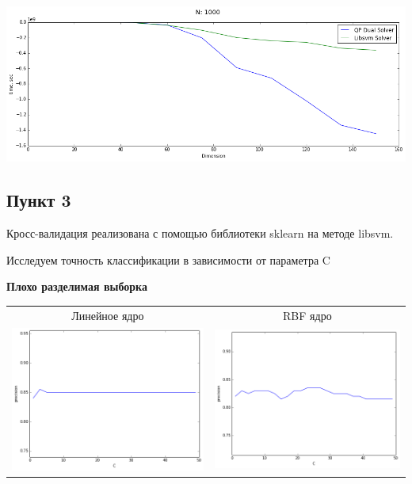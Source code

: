 \documentclass[12pt, a4paper]{article}
\begin{document}
			\begin{center}
				\includegraphics[width=18cm]{2par_obj_N1000_one.png}
			\end{center}

		\newpage
		\subsection{Пункт 3}
			Кросс-валидация реализована с помощью библиотеки sklearn на методе libsvm.

			Исследуем точность классификации в зависимости от параметра C

			\begin{center}{\bf Плохо разделимая выборка}\end{center}

			\begin{center}
			\begin{tabular}{c c}
				Линейное ядро & RBF ядро \\
				\includegraphics[width=8cm]{3par_bad_lin_C.png} &
				\includegraphics[width=8cm]{3par_bad_rbf_C.png}
			\end{tabular}				
			\end{center}
\end{document}
